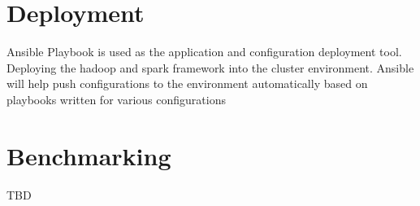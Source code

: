 \documentclass[9pt,twocolumn,twoside]{../../styles/osajnl}
\begin{document}
    
\section{Deployment}
Ansible Playbook is used as the application and configuration
deployment tool. Deploying the hadoop and spark framework into the
cluster environment. Ansible will help push configurations to the
environment automatically based on playbooks written for various
configurations


\section{Benchmarking}
TBD


\end{document}
